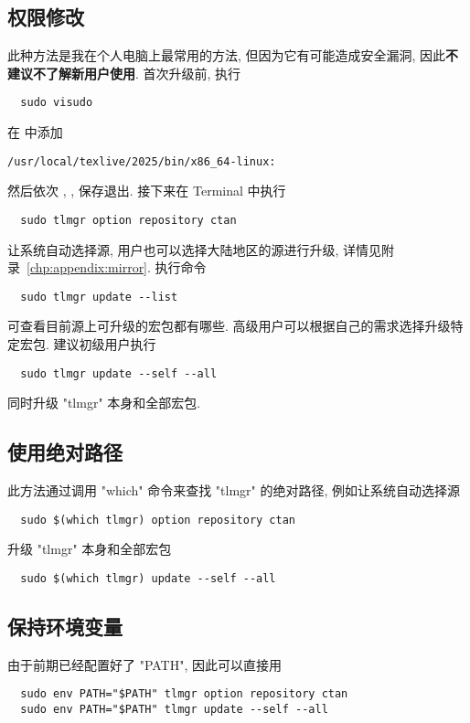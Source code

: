 \subsection{权限修改}

此种方法是我在个人电脑上最常用的方法,
但因为它有可能造成安全漏洞,
因此\textbf{不建议不了解新用户使用}.
首次升级前,
执行
\begin{lstlisting}
  sudo visudo
\end{lstlisting}
在  中添加
\begin{lstlisting}[language = {}]
  /usr/local/texlive/2025/bin/x86_64-linux:
\end{lstlisting}
然后依次 , , \keys{\enter} 保存退出.
接下来在 \textsf{Terminal} 中执行
\begin{lstlisting}
  sudo tlmgr option repository ctan
\end{lstlisting}
让系统自动选择源,
用户也可以选择大陆地区的源进行升级,
详情见附录~\ref{chp:appendix:mirror}.
执行命令
\begin{lstlisting}
  sudo tlmgr update --list
\end{lstlisting}
可查看目前源上可升级的宏包都有哪些.
高级用户可以根据自己的需求选择升级特定宏包.
建议初级用户执行
\begin{lstlisting}
  sudo tlmgr update --self --all
\end{lstlisting}
同时升级 "tlmgr" 本身和全部宏包.

\subsection{使用绝对路径}

此方法通过调用 "which" 命令来查找 "tlmgr" 的绝对路径,
例如让系统自动选择源
\begin{lstlisting}
  sudo $(which tlmgr) option repository ctan
\end{lstlisting}
升级 "tlmgr" 本身和全部宏包
\begin{lstlisting}
  sudo $(which tlmgr) update --self --all
\end{lstlisting}

\subsection{保持环境变量}

由于前期已经配置好了 "PATH",
因此可以直接用
\begin{lstlisting}
  sudo env PATH="$PATH" tlmgr option repository ctan
  sudo env PATH="$PATH" tlmgr update --self --all
\end{lstlisting}

